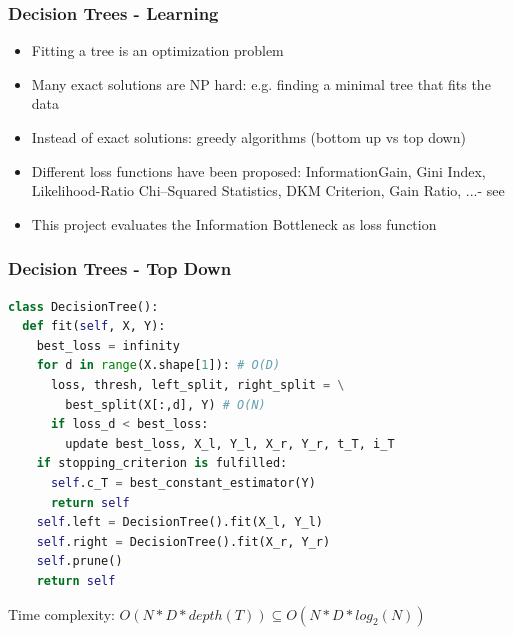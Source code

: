 \begin{frame}
   \frametitle{Decision Trees - Learning}  
   \begin{itemize}
   \item Fitting a tree is an optimization problem
   \item Many exact solutions are NP hard: e.g. finding a minimal tree that fits the data
   \item Instead of exact solutions: greedy algorithms (bottom up vs top down)
   \item Different loss functions have been proposed: \newline
   InformationGain, Gini Index,  Likelihood-Ratio Chi–Squared Statistics, DKM Criterion, Gain Ratio, ...- see \cite{rokach_decision_2005}
   \item This project evaluates the Information Bottleneck as loss function 
   \end{itemize}
\end{frame}



\begin{frame}[fragile]
   \frametitle{Decision Trees - Top Down}  
   \begin{lstlisting}[language=Python, basicstyle=\small]
class DecisionTree():
  def fit(self, X, Y):
    best_loss = infinity
    for d in range(X.shape[1]): # O(D) 
      loss, thresh, left_split, right_split = \
        best_split(X[:,d], Y) # O(N)
      if loss_d < best_loss:
        update best_loss, X_l, Y_l, X_r, Y_r, t_T, i_T
    if stopping_criterion is fulfilled:
      self.c_T = best_constant_estimator(Y)
      return self
    self.left = DecisionTree().fit(X_l, Y_l)
    self.right = DecisionTree().fit(X_r, Y_r)
    self.prune()
    return self
\end{lstlisting}

Time complexity: $O(N*D*depth(T)) \subseteq O(N*D*log_2(N))$
\end{frame}